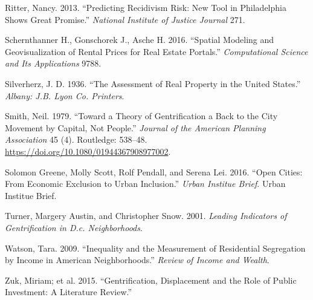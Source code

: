 \documentclass[12pt,]{article}
\begin{document}
\leavevmode\hypertarget{ref-Ritter2013}{}%
Ritter, Nancy. 2013. ``Predicting Recidivism Risk: New Tool in
Philadelphia Shows Great Promise.'' \emph{National Institute of Justice
Journal} 271.

\leavevmode\hypertarget{ref-Schernthanner2016}{}%
Schernthanner H., Gonschorek J., Asche H. 2016. ``Spatial Modeling and
Geovisualization of Rental Prices for Real Estate Portals.''
\emph{Computational Science and Its Applications} 9788.

\leavevmode\hypertarget{ref-Silverherz1936}{}%
Silverherz, J. D. 1936. ``The Assessment of Real Property in the United
States.'' \emph{Albany: J.B. Lyon Co. Printers}.

\leavevmode\hypertarget{ref-Smith1979}{}%
Smith, Neil. 1979. ``Toward a Theory of Gentrification a Back to the
City Movement by Capital, Not People.'' \emph{Journal of the American
Planning Association} 45 (4). Routledge: 538--48.
\url{https://doi.org/10.1080/01944367908977002}.

\leavevmode\hypertarget{ref-urban2016}{}%
Solomon Greene, Molly Scott, Rolf Pendall, and Serena Lei. 2016. ``Open
Cities: From Economic Exclusion to Urban Inclusion.'' \emph{Urban
Institue Brief}. Urban Institue Brief.

\leavevmode\hypertarget{ref-Turner2001}{}%
Turner, Margery Austin, and Christopher Snow. 2001. \emph{Leading
Indicators of Gentrification in D.c. Neighborhoods}.

\leavevmode\hypertarget{ref-Watson2009}{}%
Watson, Tara. 2009. ``Inequality and the Measurement of Residential
Segregation by Income in American Neighborhoods.'' \emph{Review of
Income and Wealth}.

\leavevmode\hypertarget{ref-Zuk2015}{}%
Zuk, Miriam; et al. 2015. ``Gentrification, Displacement and the Role of
Public Investment: A Literature Review.''
\end{document}
